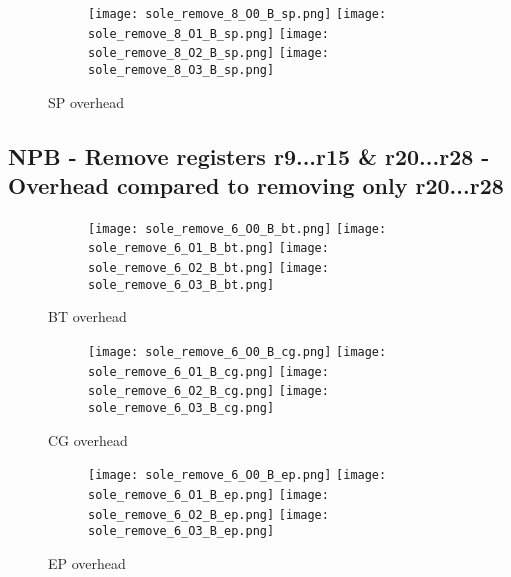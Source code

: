 \documentclass[11pt]{article}
\begin{document}
    \begin{figure}[!htb]
        \begin{subfigure}{\linewidth}
            \texttt{[image: sole\_remove\_8\_O0\_B\_sp.png]}
            \texttt{[image: sole\_remove\_8\_O1\_B\_sp.png]}
            \texttt{[image: sole\_remove\_8\_O2\_B\_sp.png]}
            \texttt{[image: sole\_remove\_8\_O3\_B\_sp.png]}
        \end{subfigure}\par\medskip
        \caption{SP overhead}
    \end{figure}

    \subsection*{NPB - Remove registers r9...r15 \& r20...r28 - Overhead compared to removing only r20...r28}

    \begin{figure}[!htb]
        \begin{subfigure}{\linewidth}
            \texttt{[image: sole\_remove\_6\_O0\_B\_bt.png]}\hfill
            \texttt{[image: sole\_remove\_6\_O1\_B\_bt.png]}\hfill
            \texttt{[image: sole\_remove\_6\_O2\_B\_bt.png]}\hfill
            \texttt{[image: sole\_remove\_6\_O3\_B\_bt.png]}\hfill
        \end{subfigure}\par\medskip
        \caption{BT overhead}
    \end{figure}

    \begin{figure}[!htb]
        \begin{subfigure}{\linewidth}
            \texttt{[image: sole\_remove\_6\_O0\_B\_cg.png]}\hfill
            \texttt{[image: sole\_remove\_6\_O1\_B\_cg.png]}\hfill
            \texttt{[image: sole\_remove\_6\_O2\_B\_cg.png]}\hfill
            \texttt{[image: sole\_remove\_6\_O3\_B\_cg.png]}\hfill
        \end{subfigure}\par\medskip
        \caption{CG overhead}
    \end{figure}
\begin{figure}[!htb]
        \begin{subfigure}{\linewidth}
            \texttt{[image: sole\_remove\_6\_O0\_B\_ep.png]}\hfill
            \texttt{[image: sole\_remove\_6\_O1\_B\_ep.png]}\hfill
            \texttt{[image: sole\_remove\_6\_O2\_B\_ep.png]}\hfill
            \texttt{[image: sole\_remove\_6\_O3\_B\_ep.png]}\hfill
        \end{subfigure}\par\medskip
        \caption{EP overhead}
\end{figure}
\end{document}

